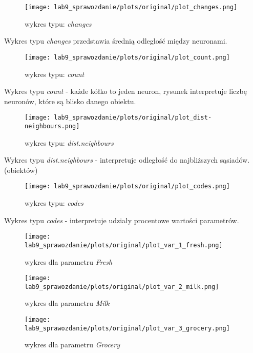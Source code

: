 \documentclass[a4paper,12pt]{article}
\theoremstyle{mytheor}
\begin{document}
\begin{figure}[H]
    \centering
    \texttt{[image: lab9\_sprawozdanie/plots/original/plot\_changes.png]}
    \caption{wykres typu: \emph{changes}}
    \label{fig:plot1}
\end{figure}
Wykres typu \emph{changes} przedstawia średnią odleglość między neuronami.\\

\begin{figure}[H]
    \centering
    \texttt{[image: lab9\_sprawozdanie/plots/original/plot\_count.png]}
    \caption{wykres typu: \emph{count}}
    \label{fig:plot2}
\end{figure}
Wykres typu \emph{count} - każde kółko to jeden neuron, rysunek interpretuje liczbę neuronów, które są blisko danego obiektu.\\

\begin{figure}[H]
    \centering
    \texttt{[image: lab9\_sprawozdanie/plots/original/plot\_dist-neighbours.png]}
    \caption{wykres typu: \emph{dist.neighbours}}
    \label{fig:plot3}
\end{figure}
Wykres typu \emph{dist.neighbours} - interpretuje odległość do najbliższych sąsiadów. (obiektów)\\

\begin{figure}[H]
    \centering
    \texttt{[image: lab9\_sprawozdanie/plots/original/plot\_codes.png]}
    \caption{wykres typu: \emph{codes}}
    \label{fig:plot4}
\end{figure}
Wykres typu \emph{codes} - interpretuje udziały procentowe wartości parametrów.\\

\begin{figure}[H]
    \centering
    \texttt{[image: lab9\_sprawozdanie/plots/original/plot\_var\_1\_fresh.png]}
    \caption{wykres dla parametru \emph{Fresh}}
    \label{fig:plot5}
\end{figure}

\begin{figure}[H]
    \centering
    \texttt{[image: lab9\_sprawozdanie/plots/original/plot\_var\_2\_milk.png]}
    \caption{wykres dla parametru \emph{Milk}}
    \label{fig:plot6}
\end{figure}

\begin{figure}[H]
    \centering
    \texttt{[image: lab9\_sprawozdanie/plots/original/plot\_var\_3\_grocery.png]}
    \caption{wykres dla parametru \emph{Grocery}}
    \label{fig:plot7}
\end{figure}
\end{document}
